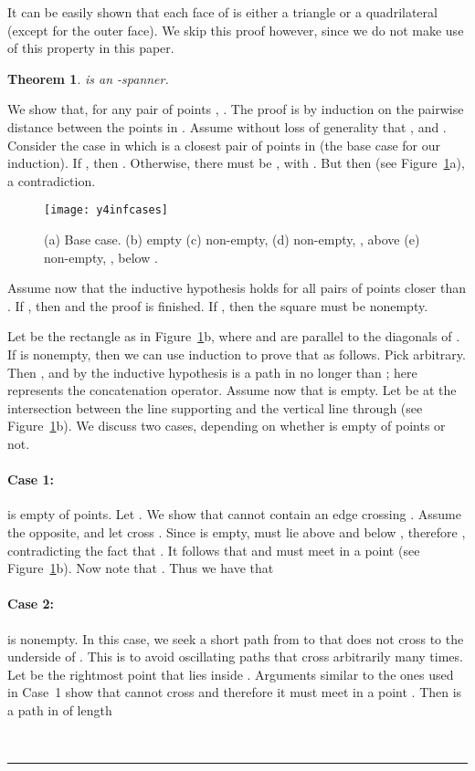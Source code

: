 \pdfoutput=1  \documentclass[11pt]{article}
\newtheorem{theorem}{Theorem}
\newcommand{\qed}{\rule{0.5em}{1.5ex}}
\newcommand{\fqed}{{\hfill~\qed}}
\newenvironment{proof}{{\noindent \bf Proof.}}
                      {{\hfill \fqed} \vspace{1em}}
\begin{document}
\noindent
It can be easily shown that each face of  is either a triangle
or a quadrilateral (except for the outer face). We skip this proof however,
since we do not make use of this property in this paper.

\begin{theorem}
 is an -spanner.
\label{thm:y4infspanner}
\end{theorem}
\begin{proof}
We show that, for any pair of points , .
The proof is by induction on the pairwise distance between the points in .
Assume without loss of generality that , and .
Consider the case in which  is a closest pair of points in  (the base case
for our induction). If , then .
Otherwise, there must be , with
. But then 
(see Figure~\ref{fig:y4inf}a), a contradiction.

\begin{figure}[htp]
\centering
\texttt{[image: y4infcases]}
\caption{(a) Base case. (b)  empty (c)  non-empty, 
(d)  non-empty, ,  above 
(e)  non-empty, ,  below .}
\label{fig:y4inf}
\end{figure}


Assume now that the inductive hypothesis holds for all pairs of points
closer than . If , then 
and the proof is finished. If , then the square  must be nonempty.

Let  be the rectangle  as in Figure~\ref{fig:y4inf}b, where  and
 are parallel to the diagonals of .
If  is nonempty, then we can use induction to prove that 
as follows. Pick  arbitrary. Then ,
and by the inductive hypothesis  is a path in  no
longer than ; here  represents the 
concatenation operator.
Assume now that  is empty.
Let  be at the intersection between the line supporting  and the
vertical line through  (see Figure~\ref{fig:y4inf}b).
We discuss two cases, depending on whether
 is empty of points or not.

\paragraph{Case 1: }  is empty of points. Let . We show that
 cannot contain an edge crossing . Assume the opposite, and let
 cross . Since  is empty,  must lie above
 and  below ,  therefore
,
contradicting the fact that . It follows that
 and  must meet in a point  (see Figure~\ref{fig:y4inf}b).
Now note that
.
Thus we have that

\paragraph{Case 2: }  is nonempty.
In this case, we seek a short path from  to  that does not
cross to the underside of . This is to avoid oscillating paths
that cross  arbitrarily many times. Let  be the rightmost point
that lies inside . Arguments similar to the ones used in Case~1 show that
 cannot cross  and therefore it must meet  in a point . Then
 is a path in  of length


\end{proof}
\end{document}
